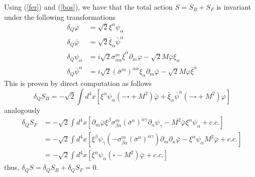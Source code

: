 \documentclass[a4paper,12pt]{article}
\numberwithin{equation}{section}
\numberwithin{exe}{section}
\newcommand{\p}{{\partial}}
\renewcommand{\a}{{\alpha}}
\newcommand{\ad}{{\dot\alpha}}
\renewcommand{\b}{{\beta}}
\newcommand{\g}{{\gamma}}
\renewcommand{\d}{{\delta}}
\newcommand{\s}{{\sigma}}
\renewcommand{\sb}{{\bar\sigma}}
\newcommand{\vphi}{{\varphi}}
\newcommand{\vphib}{{\bar\varphi}}
\newcommand{\xib}{{\bar\xi}}
\newcommand{\psib}{{\bar\psi}}
\begin{document}
Using (\ref{fer}) and (\ref{bos}), we have that the total action $S = S_B + S_F$ is invariant under the following transformations
	\begin{equation}\label{susyWZ}
		\begin{aligned}
		\d_Q\vphi & = \sqrt2 \xi^\a \psi_\a \\
		\d_Q\vphib & = \sqrt2 \xib_\ad \psib^\ad \\
		\d_Q\psi_\a & = i\sqrt2 \s^m_{\a\ad} \xib^\ad \p_m\vphi - \sqrt2 M\vphib\xi_\a \\
		\d_Q\psib^\ad & = i\sqrt2 (\sb^m)^{\ad\a} \xi_\a \p_m\vphib - \sqrt2 M\vphi\xib^\ad
		\end{aligned}
	\end{equation}
This is proven by direct computation as follows
	\begin{equation}
	\d_Q S_B = -\sqrt2 \int d^4 x [\xi^\a\psi_\a (-\square + M^2)\vphib + \xib_\ad \psib^\ad(-\square + M^2) \vphi]
	\end{equation}
analogously
	\begin{align}
	\d_Q S_F & = -\sqrt2 \int d^4 x [\p_m\vphib \xi^\b \s^m_{\b\ad} (\sb^n)^{\ad\g}\p_n\psi_\g - M^2 \vphib\xi^\a\psi_\a + c.c.] \nonumber \\
	& = -\sqrt2 \int d^4 x[\xi^\b\psi_\g (-\s^m_{\b\ad}(\sb^n)^{\ad\g})\p_m\p_n\vphib - \xi^\a\psi_\a M^2 \vphib + c.c.] \nonumber \\
	& = -\sqrt2 \int d^4 x[\xi^\a\psi_\a (\square - M^2)\vphib + c.c.]
	\end{align}
thus, $\d_Q S = \d_Q S_B + \d_Q S_F = 0$.
\end{document}
